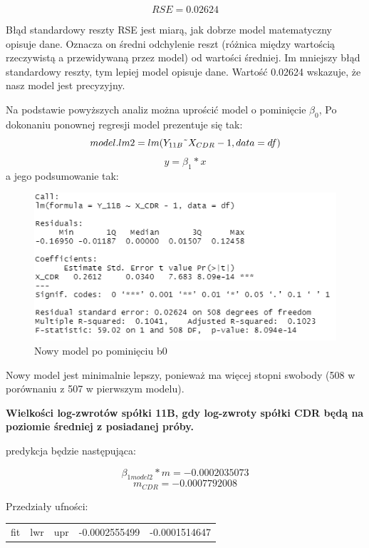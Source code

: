 \documentclass[a4paper,11pt]{article}
\def\\{\hfill\break}
\begin{document}
$$ RSE = 0.02624$$

 Błąd standardowy reszty RSE jest miarą, jak dobrze model matematyczny opisuje dane. Oznacza on średni odchylenie reszt (różnica między wartością rzeczywistą a przewidywaną przez model) od wartości średniej. Im mniejszy błąd standardowy reszty, tym lepiej model opisuje dane. Wartość 0.02624 wskazuje, że nasz model jest precyzyjny.

\\\\
Na podstawie powyższych analiz można uprościć model o pominięcie $\beta_0$,
Po dokonaniu ponownej regresji model prezentuje się tak: 
$$model.lm2 = lm(Y_{11B} \char`\~ X_{CDR}-1,data=df)$$ 
$$ y = \beta_1*x$$
a jego podsumowanie tak:
 \begin{figure}[H]
    \includegraphics[width=12cm]{Wykresy/model_nowy.png}
    \caption{Nowy model po pominięciu b0}
\end{figure}
\\
 Nowy model jest minimalnie lepszy, ponieważ ma więcej stopni swobody (508 w porównaniu z 507 w pierwszym modelu).

\\\\
 \textbf{Wielkości log-zwrotów spółki 11B, gdy log-zwroty spółki CDR będą na poziomie średniej z posiadanej próby.}

predykcja będzie następująca:

$$\beta_{1 model2}*m =-0.0002035073  $$
$$m_{CDR}= -0.0007792008 $$

Przedziały ufności:
\begin{table}[H]
\centering 
\begin{tabular}{|l|l|l|l|l|}
\hline
fit & lwr & upr \\ \hline
-0.0002035073 & -0.0002555499 & -0.0001514647 \\ \hline
\end{tabular}
\end{table}
\end{document}
